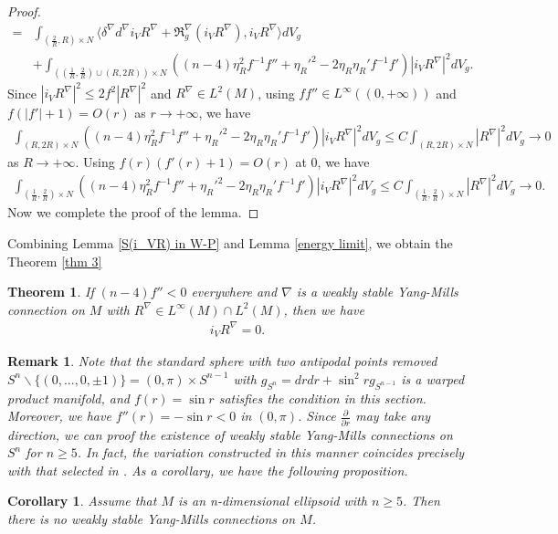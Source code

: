 \documentclass{amsart}
\newtheorem{theorem}{Theorem}[section]
\newtheorem{corollary}{Corollary}[section]
\newtheorem{remark}{Remark}[section]
\begin{document}
\begin{proof}
\begin{align*}
			=&\int_{(\frac2R,R)\times N}\langle\delta^\nabla d^\nabla i_VR^\nabla+\mathfrak{R}^\nabla_g(i_VR^\nabla),i_VR^\nabla\rangle dV_g\\&+\int_{((\frac1R,\frac2R)\cup(R,2R))\times N}((n-4)\eta_R^2f^{-1}f''+\eta_R'^2-2\eta_R\eta_R'f^{-1}f')|i_VR^\nabla|^2dV_g.
		\end{align*}
		Since $|i_VR^\nabla|^2\le 2f^2|R^\nabla|^2$ and $R^\nabla\in L^2(M)$, using $ff''\in L^\infty((0,+\infty))$ and $f(|f'|+1)=O(r)$ as $r\to+\infty$, we have
		\begin{align*}
			\int_{(R,2R)\times N}((n-4)\eta_R^2f^{-1}f''+\eta_R'^2-2\eta_R\eta_R'f^{-1}f')|i_VR^\nabla|^2dV_g\le C\int_{(R,2R)\times N}|R^\nabla|^2dV_g\to0
		\end{align*}
		as $R\to+\infty$. Using $f(r)(f'(r)+1)=O(r)$ at 0, we have
		\begin{align*}
			\int_{(\frac1R,\frac2R)\times N}((n-4)\eta_R^2f^{-1}f''+\eta_R'^2-2\eta_R\eta_R'f^{-1}f')|i_VR^\nabla|^2dV_g\le C\int_{(\frac1R,\frac2R)\times N}|R^\nabla|^2dV_g\to0.
		\end{align*}
		Now we complete the proof of the lemma.
	\end{proof}
	Combining Lemma \ref{S(i_VR) in W-P} and Lemma \ref{energy limit}, we obtain the Theorem \ref{thm 3}
	\begin{theorem}
		If $(n-4)f''<0$ everywhere and $\nabla$ is a weakly stable Yang-Mills connection on $M$ with $R^\nabla\in L^\infty(M)\cap L^2(M)$, then we have
		\begin{align*}
			i_VR^\nabla=0.
		\end{align*}
	\end{theorem}
	\begin{remark}
		Note that the standard sphere with two antipodal points removed  $S^n\backslash\{{(0,...,0,\pm1)}\}=(0,\pi)\times S^{n-1}$ with $g_{S^n}=drdr+\sin^2rg_{S^{n-1}}$ is a warped product manifold, and $f(r)=\sin r$ satisfies the condition in this section. Moreover, we have $f''(r)=-\sin r<0$ in $(0,\pi)$. Since $\frac{\partial}{\partial r}$ may take any direction, we can proof the existence of weakly stable Yang-Mills connections on $S^n$ for $n\ge5$. In fact, the variation constructed in this manner coincides precisely with that selected in \cite{BL}. As a corollary, we have the following proposition.
	\end{remark}
	\begin{corollary}
		Assume that $M$ is an n-dimensional ellipsoid with $n\ge5$. Then there is no weakly stable Yang-Mills connections on $M$.
	\end{corollary}
	
\end{document}
